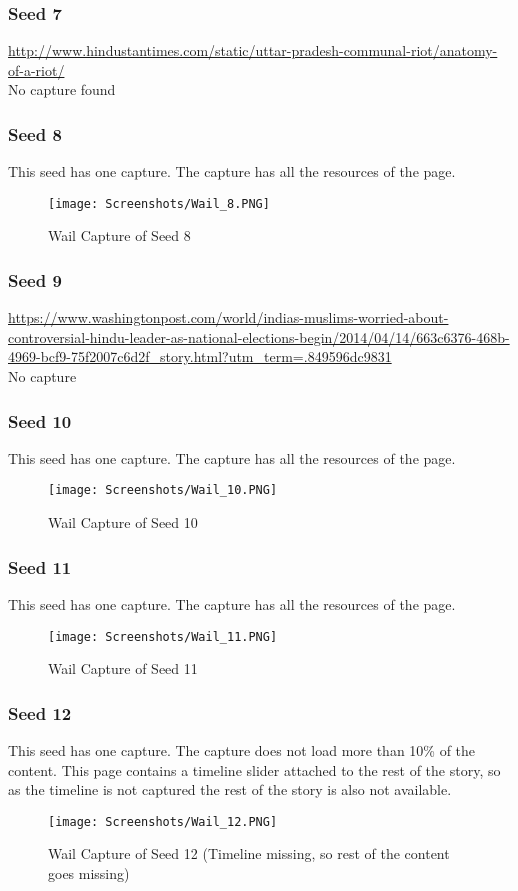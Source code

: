 \documentclass[11pt,journal,compsoc,onecolumn]{IEEEtran}
\begin{document}
\subsubsection{Seed 7}
\url{http://www.hindustantimes.com/static/uttar-pradesh-communal-riot/anatomy-of-a-riot/}\\
No capture found
\subsubsection{Seed 8}
This seed has one capture. The capture has all the resources of the page.  
 \begin{figure}[ht] 
  \centering
  \texttt{[image: Screenshots/Wail\_8.PNG]}
  \caption{Wail Capture of Seed 8}
  \label{fig:47}
\end{figure}
\subsubsection{Seed 9}
\url{https://www.washingtonpost.com/world/indias-muslims-worried-about-controversial-hindu-leader-as-national-elections-begin/2014/04/14/663c6376-468b-4969-bcf9-75f2007c6d2f_story.html?utm_term=.849596dc9831}\\
No capture 
\subsubsection{Seed 10}
This seed has one capture. The capture has all the resources of the page.   
 \begin{figure}[ht] 
  \centering
  \texttt{[image: Screenshots/Wail\_10.PNG]}
  \caption{Wail Capture of Seed 10}
  \label{fig:49}
\end{figure}
\subsubsection{Seed 11}
This seed has one capture. The capture has all the resources of the page.   
 \begin{figure}[ht] 
  \centering
  \texttt{[image: Screenshots/Wail\_11.PNG]}
  \caption{Wail Capture of Seed 11}
  \label{fig:50}
\end{figure}
\subsubsection{Seed 12}
This seed has one capture. The capture does not load more than 10\% of the content. This page contains a timeline slider attached to the rest of the story, so as the timeline is not captured the rest of the story is also not available.    
 \begin{figure}[ht] 
  \centering
  \texttt{[image: Screenshots/Wail\_12.PNG]}
  \caption{Wail Capture of Seed 12 (Timeline missing, so rest of the content goes missing)}
  \label{fig:51}
\end{figure}
\end{document}
